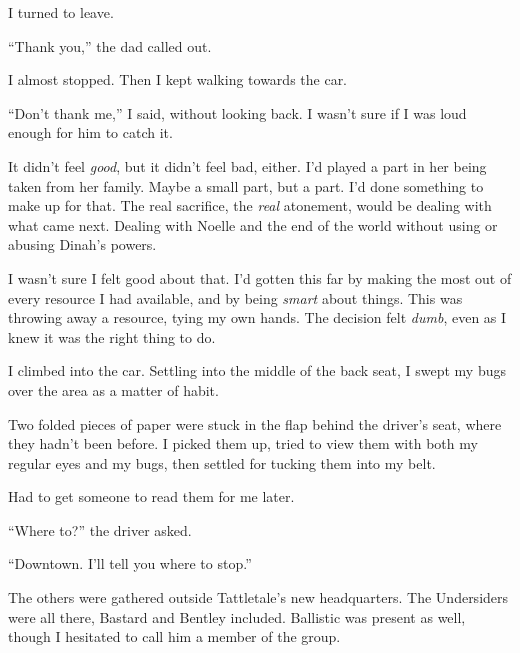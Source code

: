 I turned to leave.



``Thank you,'' the dad called out.



I almost stopped.  Then I kept walking towards the car.



``Don't thank me,'' I said, without looking back.  I wasn't sure if I was loud enough for him to catch it.



It didn't feel \emph{good}, but it didn't feel bad, either.  I'd played a part in her being taken from her family.  Maybe a small part, but a part.  I'd done something to make up for that.  The real sacrifice, the \emph{real} atonement, would be dealing with what came next.  Dealing with Noelle and the end of the world without using or abusing Dinah's powers.



I wasn't sure I felt good about that.  I'd gotten this far by making the most out of every resource I had available, and by being \emph{smart} about things.  This was throwing away a resource, tying my own hands.  The decision felt \emph{dumb}, even as I knew it was the right thing to do.



I climbed into the car.  Settling into the middle of the back seat, I swept my bugs over the area as a matter of habit.



Two folded pieces of paper were stuck in the flap behind the driver's seat, where they hadn't been before.  I picked them up, tried to view them with both my regular eyes and my bugs, then settled for tucking them into my belt.



Had to get someone to read them for me later.



``Where to?'' the driver asked.



``Downtown.  I'll tell you where to stop.''



\blacksquare



The others were gathered outside Tattletale's new headquarters.  The Undersiders were all there, Bastard and Bentley included.  Ballistic was present as well, though I hesitated to call him a member of the group.



